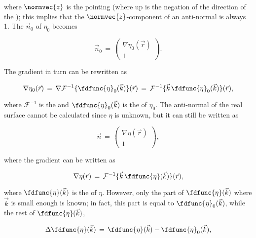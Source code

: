 {where $\normvec{z}$ is the  pointing \up (where up is the negation of the direction of the ); this implies that the $\normvec{z}$-component of an anti-normal is always 1. The  $\vec{n}_0$ of $\eta_0$ becomes

\begin{equation}
\vec{n}_0 \,=\, \left(\!\!\!\begin{array}{c}\nabla\eta_0(\vec{r}) \\ 1\end{array}\!\!\!\right).
\end{equation}

The gradient in turn can be rewritten as

\begin{equation}
\nabla\eta_0(\vec{r}) \,=\, \nabla\mathcal{F}^{-1}\{\fdfunc{\eta}_0(\vec{k})\}(\vec{r}) \,=\, \mathcal{F}^{-1}\{\vec{k}\,\fdfunc{\eta}_0(\vec{k})\}(\vec{r}),
\end{equation}

where $\mathcal{F}^{-1}$ is the  and $\fdfunc{\eta}_0(\vec{k})$ is the  of $\eta_0$. The anti-normal of the real surface cannot be calculated since $\eta$ is unknown, but it can still be written as

\begin{equation}
\vec{n} \,=\, \left(\!\!\!\begin{array}{c}\nabla\eta(\vec{r}) \\ 1\end{array}\!\!\!\right),
\end{equation}

where the gradient can be written as

\begin{equation}
\nabla\eta(\vec{r}) \,=\, \mathcal{F}^{-1}\{\vec{k}\,\fdfunc{\eta}(\vec{k})\}(\vec{r}),
\end{equation}

where $\fdfunc{\eta}(\vec{k})$ is the  of $\eta$. However, only the part of $\fdfunc{\eta}(\vec{k})$ where $\vec{k}$ is small enough is known; in fact, this part is equal to $\fdfunc{\eta}_0(\vec{k})$, while the rest of $\fdfunc{\eta}(\vec{k})$,

\begin{equation}
\Delta\fdfunc{\eta}(\vec{k}) \,=\, \fdfunc{\eta}(\vec{k}) - \fdfunc{\eta}_0(\vec{k}),
\end{equation}

}
